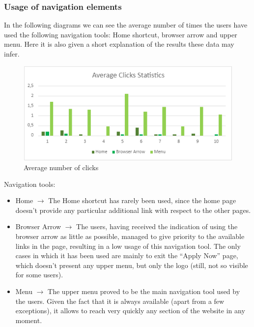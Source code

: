 \documentclass[11pt, letterpaper]{article}
\begin{document}
\subsubsection{Usage of navigation elements}
In the following diagrams we can see the average number of times the users have used the following navigation tools: Home shortcut, browser arrow and upper menu. Here it is also given a short explanation of the results these data may infer. \\
\begin{figure}[H]
    \centering
    \includegraphics[width=.6\textwidth]{images/user testing/average_clicks_statistics.png}
    \caption{Average number of clicks}
    \label{fig:clicks_stats}
\end{figure}
Navigation tools: 
\begin{itemize}
    \item Home $\rightarrow$ The Home shortcut has rarely been used, since the home page doesn’t provide any particular additional link with respect to the other pages. 
    \item Browser Arrow $\rightarrow$ The users, having received the indication of using the browser arrow as little as possible, managed to give priority to the available links in the page, resulting in a low usage of this navigation tool. The only cases in which it has been used are mainly to exit the “Apply Now” page, which doesn’t present any upper menu, but only the logo (still, not so visible for some users). 
    \item Menu $\rightarrow$ The upper menu proved to be the main navigation tool used by the users. Given the fact that it is always available (apart from a few exceptions), it allows to reach very quickly any section of the website in any moment. 
\end{itemize}
\end{document}
